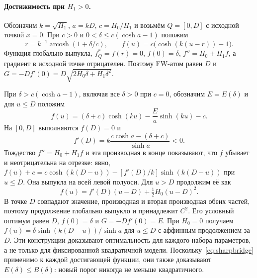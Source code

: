 \paragraph{Достижимость при $H_1>0$.}
Обозначим $k=\sqrt{H_1}$, $a=kD$, $c=H_0/H_1$ и возьмём
$Q=[0,D]$ с исходной точкой $x=0$. При $c>0$ и
$0<\delta\le c(\cosh a-1)$ положим
\[
 r=k^{-1}\operatorname{arcosh}(1+\delta/c),\qquad
 f(u)=c\big(\cosh(k(u-r))-1\big).
\]
Функция глобально выпукла, $f_Q^*=f(r)=0$, $f(0)=\delta$,
$f''=H_0+H_1f$, а градиент в исходной точке отрицателен.
Поэтому FW-атом равен $D$ и
$G=-Df'(0)=D\sqrt{2H_0\delta+H_1\delta^2}$.

При $\delta>c(\cosh a-1)$, включая все $\delta>0$ при $c=0$,
обозначим $E=E(\delta)$ и для $u\le D$ положим
\[
 f(u)=(\delta+c)\cosh(ku)-\frac{E}{a}\sinh(ku)-c.
\]
На $[0,D]$ выполняются $f(D)=0$ и
\[
 f'(D)=k\frac{c\cosh a-(\delta+c)}{\sinh a}<0.
\]
Тождество $f''=H_0+H_1f$ и эта производная в конце показывают,
что $f$ убывает и неотрицательна на отрезке: явно,
$f(u)+c=c\cosh(k(D-u))-[f'(D)/k]\sinh(k(D-u))$ при $u\le D$.
Она выпукла на всей левой полуоси. Для $u>D$ продолжим её как
\[
 f(u)=f'(D)(u-D)+\tfrac12H_0(u-D)^2.
\]
В точке $D$ совпадают значение, производная и вторая производная
обеих частей, поэтому продолжение глобально выпукло и принадлежит
$C^2$. Его условный оптимум равен $D$, $f(0)=\delta$ и
$G=-Df'(0)=E$. При $H_0=0$ получаем
$f(u)=\delta\sinh(k(D-u))/\sinh a$ для $u\le D$ с аффинным
продолжением за $D$. Эти конструкции доказывают оптимальность для
каждого набора параметров, а не только для фиксированной квадратичной
модели. Поскольку~\eqref{eq:sharpbridge} применимо к каждой
достигающей функции, они также доказывают
$E(\delta)\le\widehat B(\delta)$: новый порог никогда не меньше
квадратичного.

